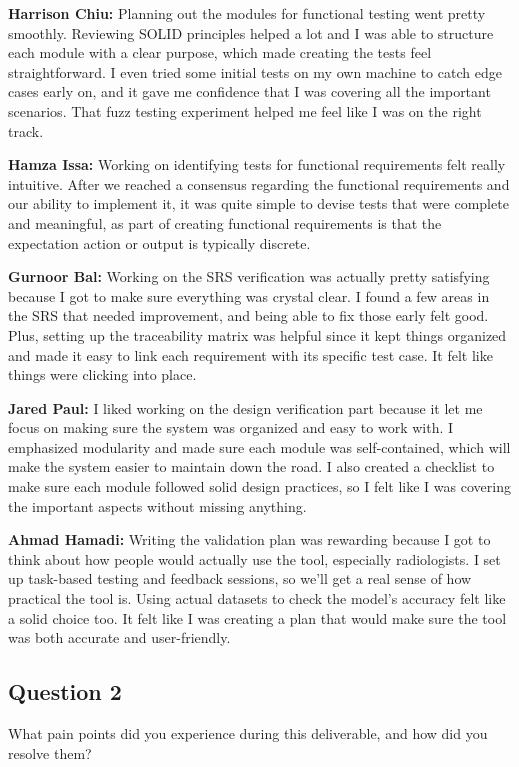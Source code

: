 \documentclass[12pt, titlepage]{article}
\begin{document}
\textbf{Harrison Chiu:}  Planning out the modules for functional testing went pretty smoothly. Reviewing SOLID principles helped a lot and I was able to structure each module with a clear purpose, which made creating the tests feel straightforward. I even tried some initial tests on my own machine to catch edge cases early on, and it gave me confidence that I was covering all the important scenarios. That fuzz testing experiment helped me feel like I was on the right track.

\textbf{Hamza Issa:} Working on identifying tests for functional requirements felt really intuitive. After we reached a consensus regarding the functional requirements and our ability to implement it, it was quite simple to devise tests that were complete and meaningful, as part of creating functional requirements is that the expectation action or output is typically discrete.

\textbf{Gurnoor Bal:} Working on the SRS verification was actually pretty satisfying because I got to make sure everything was crystal clear. I found a few areas in the SRS that needed improvement, and being able to fix those early felt good. Plus, setting up the traceability matrix was helpful since it kept things organized and made it easy to link each requirement with its specific test case. It felt like things were clicking into place.

\textbf{Jared Paul:} I liked working on the design verification part because it let me focus on making sure the system was organized and easy to work with. I emphasized modularity and made sure each module was self-contained, which will make the system easier to maintain down the road. I also created a checklist to make sure each module followed solid design practices, so I felt like I was covering the important aspects without missing anything.

\textbf{Ahmad Hamadi:} Writing the validation plan was rewarding because I got to think about how people would actually use the tool, especially radiologists. I set up task-based testing and feedback sessions, so we’ll get a real sense of how practical the tool is. Using actual datasets to check the model’s accuracy felt like a solid choice too. It felt like I was creating a plan that would make sure the tool was both accurate and user-friendly.

\subsection{Question 2}
What pain points did you experience during this deliverable, and how did you resolve them? \\
\end{document}

